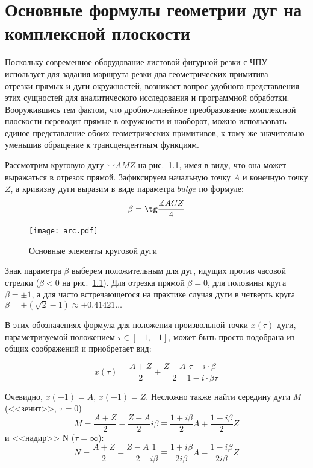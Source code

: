 
\chapter{%
  Основные формулы геометрии дуг на комплексной плоскости
}
\label{app:bulge}

Поскольку современное оборудование листовой фигурной резки с ЧПУ
использует для задания маршрута резки два геометрических примитива ---
отрезки прямых и дуги окружностей,
возникает вопрос удобного представления этих сущностей
для аналитического исследования и программной обработки.
Вооружившись тем фактом,
что дробно-линейное преобразование комплексной плоскости
переводит прямые в окружности и наоборот,
можно использовать единое представление обоих
геометрических примитивов,
к тому же значительно уменьшив обращение
к трансцендентным функциям.

Рассмотрим круговую дугу
${\smile}AMZ$
на рис.~\ref{fig:app.arc},
имея в виду,
что она может выражаться в отрезок прямой.
Зафиксируем начальную точку $A$
и конечную точку $Z$,
а кривизну дуги выразим в виде параметра
$bulge$
по формуле:
\begin{equation}
  \beta = \tg \frac{\measuredangle ACZ}{4}
\end{equation}

\begin{figure}
  \centering
  \texttt{[image: arc.pdf]}
  \caption{Основные элементы круговой дуги}
  \label{fig:app.arc}
\end{figure}

Знак параметра $\beta$
выберем положительным для дуг,
идущих против часовой стрелки
($\beta < 0$ на рис.~\ref{fig:app.arc}).
Для отрезка прямой
$\beta=0$,
для половины круга
$\beta = \pm 1$,
а для часто встречающегося на практике
случая дуги в четверть круга
$\beta = \pm(\sqrt{2}-1)\approx \pm 0.41421 \dots$

В этих обозначениях формула для положения
произвольной точки
$x(\tau)$ дуги,
параметризуемой положением
$\tau \in[-1,+1]$,
может быть просто подобрана из общих соображений
и приобретает вид:

\begin{equation}
  \label{eq:bulge.x}
  x(\tau) =
  \frac{A+Z}{2} + \frac{Z-A}{2}\frac{\tau - i \cdot \beta}{1 - i \cdot \beta \tau}
\end{equation}

Очевидно,
$x(-1) = A$,
$x(+1) = Z$.
Несложно также найти середину дуги
$M$
(<<зенит>>,
$\tau=0$)
$$
M = \frac{A+Z}{2} - \frac{Z-A}{2}i\beta
\equiv
\frac{1+i \beta}2 A + \frac{1-i \beta}2 Z
$$
и <<надир>> N
($\tau=\infty$):
$$
N = \frac{A+Z}{2} - \frac{Z-A}{2} \frac{1}{i\beta}
\equiv
\frac{1+i \beta}{2 i \beta} A - \frac{1 - i \beta}{2 i\beta} Z
$$

